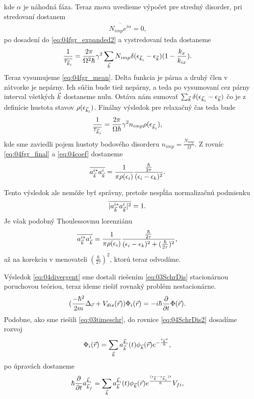 kde $\alpha$ je náhodná fáza. Teraz znova uvedieme výpočet pre stredný disorder, pri stredovaní dostanem
\begin{align}
\overline{N_{imp}e^{i\alpha}}=0\text{,}
\end{align}
po dosadení do \eqref{eq:04fgr_expanded2}  a vystredovaní teda dostaneme 
\begin{align}
\label{eq:04fgr_mean}
\frac{1}{\overline{\tau_{\vec{k}_i}}}=\frac{2\pi}{\Omega^2\hbar}\gamma^2\sum_{\vec{k}}N_{imp}\delta(\epsilon_{\vec{k}_i}-\epsilon_{\vec{k}})(1-\frac{k_x}{k_{ix}})\text{.}
\end{align}
Teraz vysumujeme \eqref{eq:04fgr_mean}. Delta funkcia je párna a druhý člen v zátvorke je nepárny. Ich súčin bude tiež nepárny, a teda po vysumovaní cez párny interval všetkých $\vec{k}$ dostaneme nulu. Ostáva nám sumovať $\sum_{\vec{k}}\delta(\epsilon_{\vec{k}_i}-\epsilon_{\vec{k}})$ čo je z definície hustota stavov $\rho(\epsilon_{\vec{k}_i})$. Finálny výsledok pre relaxačný čas teda bude
\begin{align}
\label{eq:04fgr_final}
\frac{1}{\overline{\tau_{\vec{k}_i}}}=\frac{2\pi}{\Omega\hbar}\gamma^2n_{imp}\rho(\epsilon_{\vec{k}_i}) \text{,}
\end{align}
kde sme zaviedli pojem hustoty bodového disorderu $n_{imp}=\frac{N_{imp}}{\Omega}$. Z rovníc \eqref{eq:04fgr_final} a \eqref{eq:04coef} dostaneme 
\begin{align}
\label{eq:04divergent}
\overline{a_{\vec{k}}^{i*}a_{\vec{k}}^i}=\frac{1}{\pi\rho(\epsilon_{i})}\frac{\frac{\hbar}{2\tau}}{(\epsilon_{i}-\epsilon_{k})^2}\text{.}
\end{align}

Tento výsledok ale nemôže byť správny, pretože nespĺňa normalizačnú podmienku 
\begin{align}
\overline{|a_{\vec{k}}^{i*}a_{\vec{k}}^i|^2}=1\text{.}
\end{align}
Je však podobný Thoulessovmu lorenziánu
\begin{align}
\label{eq:04lorenz}
\overline{a_{\vec{k}}^{i*}a_{\vec{k}}^i}=\frac{1}{\pi\rho(\epsilon_i)}\frac{\frac{\hbar}{2\tau}}{(\epsilon_i-\epsilon_{k})^2+(\frac{\hbar}{2\tau})^2}\text{,}
\end{align}
až na korekciu v menovateli $(\frac{\hbar}{2\tau})^2$, ktorú teraz odvodíme.

Výsledok \eqref{eq:04divergent} sme dostali riešením \eqref{eq:03SchrDis} stacionárnou poruchovou teóriou, teraz ideme riešiť rovnaký problém nestacionárne.
\begin{align}
\label{eq:04SchrDis2}
(\frac{-\hbar^2}{2m}\Delta_{\vec{r}} + V_{dis}(\vec{r}))\Phi_i(\vec{r})=-i\hbar \frac{\partial}{\partial t}\Phi(\vec{r})  \text{.}
\end{align}
Podobne, ako sme riešili \eqref{eq:03timeschr}, do rovnice \eqref{eq:04SchrDis2} dosadíme rozvoj 
\begin{align}
\Phi_i(\vec{r})=\sum_{\vec{k}}a^{\vec{k}_i}_{\vec{k}}(t)\phi_{\vec{k}}(\vec{r})e^{-\frac{\epsilon_{\vec{k}}t}{\hbar}}\text{,}
\end{align}
po úpravách dostaneme
\begin{align}
\hbar \frac{\partial}{\partial t}a^{\vec{k}_i}_{\vec{k}_f}=\sum_{\vec{k}}a^{\vec{k}_i}_{\vec{k}}(t)\phi_{\vec{k}}(\vec{r})e^{\frac{(\epsilon_{\vec{k}}-\epsilon_{\vec{k}_i})t}{\hbar}}V_{fi}\text{,}
\end{align}

